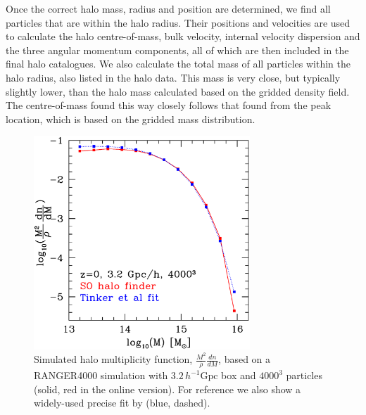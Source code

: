 \documentclass[useAMS,usenatbib]{mn2e}
\begin{document}
Once the correct halo mass, radius and position are determined, we find all 
particles that are within the halo radius. Their positions and velocities are
used to calculate the halo centre-of-mass, bulk velocity, internal velocity 
dispersion and the three angular momentum components, all of which are then 
included in the final halo catalogues. We also calculate the total mass of
all particles within the halo radius, also listed in the halo data. This mass
is very close, but  typically slightly lower, than the halo mass calculated 
based on the gridded density field. The  centre-of-mass found this way closely follows 
that found from the peak location, which is based on the gridded mass distribution. 


\begin{figure}%
  \begin{center}
    \includegraphics[width=3.2in]{graphs/mf_z0_Tinker.eps}
  \end{center}
  \caption{Simulated halo multiplicity function, 
    $\frac{M^2}{\bar{\rho}}\frac{dn}{dM}$, based on a
    RANGER4000 simulation with $3.2\,h^{-1} \mbox{Gpc}$ box and $4000^3$ 
    particles (solid, red in the online version). For reference we also show a widely-used 
    precise fit by \citet{2008ApJ...688..709T} (blue, dashed). 
    \label{mf}}
\end{figure}
\end{document}
